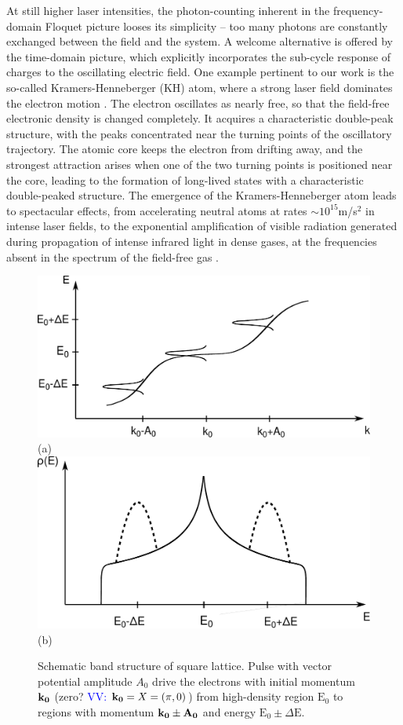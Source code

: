 \documentclass[prb,aps,twocolumn,showpacs,amsmath,amssymb]{revtex4}%
\begin{document}
At still higher laser intensities, the photon-counting inherent 
in the frequency-domain Floquet picture looses its simplicity -- 
too many photons are constantly exchanged between the field and the system. A welcome alternative is offered by  the time-domain picture, which explicitly incorporates
the sub-cycle response of charges 
to the oscillating electric field. 
One example pertinent to our work is the so-called Kramers-Henneberger (KH) atom, where a strong laser field dominates the electron motion \cite{Popov_1,Henneberger_1,Gavrila_1}. The electron oscillates as nearly free, 
so that the field-free electronic density is changed completely. 
It acquires a characteristic double-peak structure, 
with the peaks concentrated near the turning points of the 
oscillatory trajectory. The atomic core keeps the 
electron from drifting away, and the strongest attraction
arises when one of the two turning points is positioned 
near the core, leading to the formation of long-lived states
with a characteristic double-peaked structure.
The emergence of the Kramers-Henneberger atom leads to 
spectacular effects, from
accelerating neutral atoms at rates $\sim 10^{15}$m/s$^2$ in 
intense laser fields, to the exponential amplification of visible radiation generated
during propagation of intense infrared light in dense gases,
at the frequencies absent in the spectrum of the field-free 
gas \cite{Matthews_1}.

\begin{figure}
\includegraphics[width=1.0\linewidth,angle=0]{Band_sketch_1.pdf}(a)
\includegraphics[width=1.0\linewidth,angle=0]{DOS_sketch_2.pdf}(b)
\caption{Schematic band structure of square lattice. Pulse with vector potential amplitude $A_0$ drive the electrons with initial momentum $\bf k_0$ (zero?  \textcolor{blue}{VV: ${\bf {k_0}}=X=(\pi,0)$}) from high-density region $\text{E}_0$ to regions with momentum $\bf k_{0} \pm A_0$ and energy $\text{E}_{0}\pm\Delta\text{E}$.}
\label{BandPulse}  
\end{figure}
\end{document}
